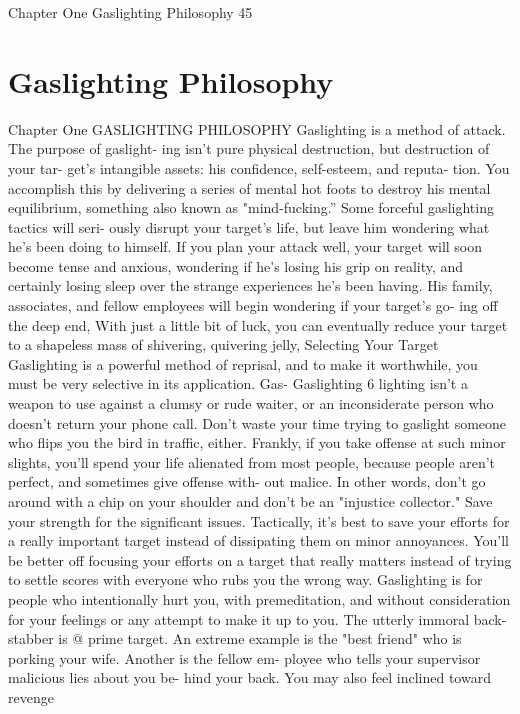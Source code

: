 \documentclass{book}
\begin{document}
  Chapter One 
Gaslighting Philosophy 
45 

\chapter{Gaslighting Philosophy}
Chapter One 
GASLIGHTING 
PHILOSOPHY 
Gaslighting is a method of attack. The purpose of gaslight- 
ing isn't pure physical destruction, but destruction of your tar- 
get's intangible assets: his confidence, self-esteem, and reputa- 
tion. You accomplish this by delivering a series of mental hot 
foots to destroy his mental equilibrium, something also known 
as "mind-fucking.” Some forceful gaslighting tactics will seri- 
ously disrupt your target's life, but leave him wondering what 
he's been doing to himself. If you plan your attack well, your 
target will soon become tense and anxious, wondering if he's 
losing his grip on reality, and certainly losing sleep over the 
strange experiences he's been having. His family, associates, 
and fellow employees will begin wondering if your target's go- 
ing off the deep end, With just a little bit of luck, you can 
eventually reduce your target to a shapeless mass of shivering, 
quivering jelly, 
Selecting Your Target 
Gaslighting is a powerful method of reprisal, and to make it 
worthwhile, you must be very selective in its application. Gas-    Gaslighting 
6 
lighting isn't a weapon to use against a clumsy or rude waiter, 
or an inconsiderate person who doesn't return your phone call. 
Don't waste your time trying to gaslight someone who flips you 
the bird in traffic, either. Frankly, if you take offense at such 
minor slights, you'll spend your life alienated from most people, 
because people aren't perfect, and sometimes give offense with- 
out malice. In other words, don’t go around with a chip on your 
shoulder and don't be an "injustice collector." Save your 
strength for the significant issues. 
Tactically, it's best to save your efforts for a really important 
target instead of dissipating them on minor annoyances. You'll 
be better off focusing your efforts on a target that really matters 
instead of trying to settle scores with everyone who rubs you 
the wrong way. 
Gaslighting is for people who intentionally hurt you, with 
premeditation, and without consideration for your feelings or 
any attempt to make it up to you. The utterly immoral back- 
stabber is @ prime target. An extreme example is the "best 
friend" who is porking your wife. Another is the fellow em- 
ployee who tells your supervisor malicious lies about you be- 
hind your back. You may also feel inclined toward revenge 
\end{document}
